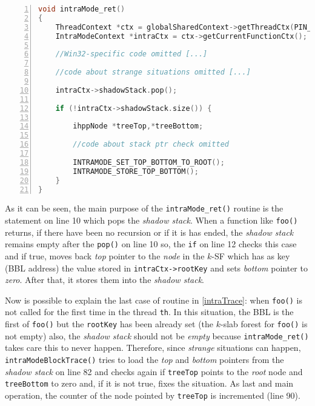 \documentclass[a4paper,10pt]{report}
\begin{document}
\begin{lstlisting}[language=C++,
	caption={partial implementation of \texttt{intraMode\_ret()}},
	label=intraRet, frame=leftline, numbers=left, showstringspaces=false]
void intraMode_ret()
{
	ThreadContext *ctx = globalSharedContext->getThreadCtx(PIN_ThreadUid());
	IntraModeContext *intraCtx = ctx->getCurrentFunctionCtx();

	//Win32-specific code omitted [...]

	//code about strange situations omitted [...]

	intraCtx->shadowStack.pop();

	if (!intraCtx->shadowStack.size()) {

		ihppNode *treeTop,*treeBottom;

		//code about stack ptr check omitted

		INTRAMODE_SET_TOP_BOTTOM_TO_ROOT();
		INTRAMODE_STORE_TOP_BOTTOM();
	}
}

\end{lstlisting}

\noindent
As it can be seen, the main purpose of the \verb|intraMode_ret()| routine
is the statement on line 10 which pops the \emph{shadow stack}.
When a function like \verb|foo()| returns, if there have been no recursion or if it
is has ended, the \emph{shadow stack} remains empty after the \verb|pop()| on line 10 so,
the \verb|if| on line 12 checks this case and if true, moves back
\emph{top} pointer to the \emph{node} in the $k$-SF which
has as key (BBL address) the value stored in \verb|intraCtx->rootKey|
and sets \emph{bottom} pointer to \emph{zero}. After that, it stores them
into the \emph{shadow stack}.

Now is possible to explain the last case of routine in \cref{intraTrace}:
when \verb|foo()| is not called for the first time in the thread \verb|th|.
In this situation, the BBL is the first of \verb|foo()| but the \verb|rootKey|
has been already set (the $k$-slab forest for \verb|foo()| is not empty) also,
the \emph{shadow stack} should not be \emph{empty} because \verb|intraMode_ret()|
takes care this to never happen.
Therefore, since \emph{strange} situations can happen, \verb|intraModeBlockTrace()|
tries to load the \emph{top} and \emph{bottom} pointers from the \emph{shadow stack}
on line 82 and checks again if \verb|treeTop| points to the \emph{root} node
and \verb|treeBottom| to zero and, if it is not true, fixes the situation.
As last and main operation, the counter of the node pointed by \verb|treeTop|
is incremented (line 90).
\end{document}
